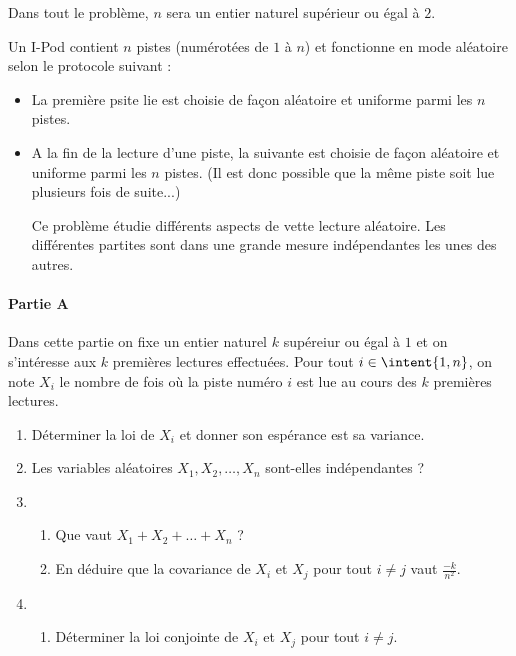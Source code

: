 \begin{probleme}
Dans tout le problème, $n$ sera un entier naturel supérieur ou égal à $2$. 

Un I-Pod contient $n$ pistes (numérotées de $1$ à $n$) et fonctionne en mode aléatoire  selon le protocole suivant : 

\begin{itemize}
\item La première psite lie est choisie de façon aléatoire et uniforme parmi les $n$ pistes. 
\item A la fin de la lecture d'une piste, la suivante est choisie de façon aléatoire et uniforme parmi les $n$ pistes. (Il est donc possible que la même piste soit lue plusieurs fois de suite...) 

Ce problème étudie différents aspects de vette lecture aléatoire. Les différentes partites sont dans une grande mesure indépendantes les unes des autres. 
\end{itemize}


\paragraph{Partie A}
\noindent

Dans cette partie on fixe un entier naturel $k$ supéreiur ou égal à $1$ et on s'intéresse aux $k$ premières lectures effectuées. Pour tout $i\in \intent{1, n}$, on note $X_i$ le nombre de fois où la piste numéro $i$ est lue au cours des $k$ premières lectures. 

\begin{enumerate}
\item Déterminer la loi de $X_i$ et donner son espérance est sa variance. 


\item Les variables aléatoires $X_1, X_2, \dots , X_n $ sont-elles indépendantes ? 


\item \begin{enumerate}
\item Que vaut $X_1 +X_2 +\dots +X_n $ ? 


\item En déduire que la covariance de $X_i$ et $X_j $ pour tout $i\neq j$ vaut $\frac{-k}{n^2}.$


\end{enumerate}
\item \begin{enumerate}
\item Déterminer la loi conjointe de $X_i $ et $X_j$ pour tout $i\neq j$. 


\end{enumerate}
\end{enumerate}
\end{probleme}
